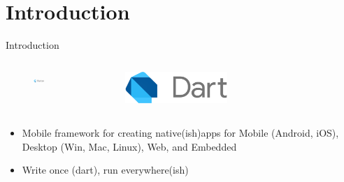 {
    \section*{Introduction}
}
\begin{frame}{Introduction}
    \begin{columns}
        \begin{column}{0.5\textwidth}
            \begin{figure}[h]
                \centering
                \includegraphics[width=0.5\textwidth]{images/flutter.pdf}
            \end{figure}
        \end{column}
        \begin{column}{0.5\textwidth}
            \begin{figure}[h]
                \centering
                \includegraphics[width=0.5\textwidth]{images/dart.pdf}
            \end{figure}
        \end{column}
    \end{columns}

    \vspace{4ex}

    \begin{itemize}
        \item Mobile framework for creating native(ish)\footnotemark[1] apps for Mobile (Android, iOS), Desktop (Win, Mac, Linux), Web, and Embedded
        \item Write once (dart), run everywhere(ish)\footnotemark[1]
    \end{itemize}

    
\end{frame}

